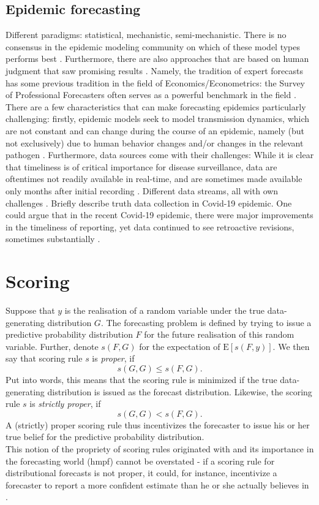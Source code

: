 \subsection{Epidemic forecasting}
Different paradigms: statistical, mechanistic, semi-mechanistic. There is no consensus in the epidemic modeling community on which of these model types performs best \cite{moran_epidemic_2016}. Furthermore, there are also approaches that are based on human judgment that saw promising results \cite{bosse_comparing_2021}. Namely, the tradition of expert forecasts has some previous tradition in the field of Economics/Econometrics: the Survey of Professional Forecasters often serves as a powerful benchmark in the field .\\
There are a few characteristics that can make forecasting epidemics particularly challenging: firstly, epidemic models seek to model transmission dynamics, which are not constant and can change during the course of an epidemic, namely (but not exclusively) due to human behavior changes and/or changes in the relevant pathogen \citep{moran_epidemic_2016}. Furthermore, data sources come with their challenges: While it is clear that timeliness is of critical importance for disease surveillance, data are oftentimes not readily available in real-time, and are sometimes made available only months after initial recording \cite{jajosky_evaluation_2004} . Different data streams, all with own challenges \cite{moran_epidemic_2016}. Briefly describe truth data collection in Covid-19 epidemic. One could argue that in the recent Covid-19 epidemic, there were major improvements in the timeliness of reporting, yet data continued to see retroactive revisions, sometimes substantially . 

\section{Scoring}
Suppose that $y$ is the realisation of a random variable under the true data-generating distribution $G$. The forecasting problem is defined by trying to issue a predictive probability distribution $F$ for the future realisation of this random variable. Further, denote $s(F,G)$ for the expectation of $\text{E}[s(F,y)]$. We then say that scoring rule $s$ is \textit{proper}, if 
\[s(G,G) \leq s(F,G).\]
Put into words, this means that the scoring rule is minimized if the true data-generating distribution is issued as the forecast distribution. Likewise, the scoring rule $s$ is \textit{strictly proper}, if 
\[s(G,G) < s(F,G).\] 
A (strictly) proper scoring rule thus incentivizes the forecaster to issue his or her true belief for the predictive probability distribution.\\
This notion of the propriety of scoring rules originated with  and its importance in the forecasting world (hmpf) cannot be overstated - if a scoring rule for distributional forecasts is not proper, it could, for instance, incentivize a forecaster to report a more confident estimate than he or she actually believes in . \\
